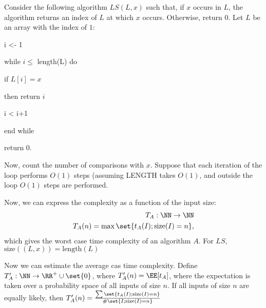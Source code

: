 \documentclass[11pt]{scrartcl}
\begin{document}
\begin{example}

  Consider the following algorithm $LS(L, x)$ such that, if $x$ occurs
  in $L$, the algorithm returns an index of $L$ at which $x$
  occurs. Otherwise, return $0$. Let $L$ be  an array with the index of $1$:

  i <- 1
  
  while $i\leq$ length(L) do

  if $L[i] = x$

  then return $i$

  i < i+1

  end while

  return 0.

  Now, count the number of comparisons with $x$. Suppose that each
  iteration of the loop performs $O(1)$ steps (assuming LENGTH takes
  $O(1)$, and outside the loop $O(1)$ steps are performed.

  Now, we can express the complexity as a function of the input size:
  \begin{align}
    T_A: \NN \to \NN\\
    T_A(n)=\max\set{t_A(I); \text{size}(I) = n},
  \end{align}
  which gives the worst case time complexity of an algorithm $A$. For $LS$, $\text{size}((L, x)) = \text{length}(L)$
\end{example}
\begin{example}
  Now we can estimate the average cas time complexity. Define $T'_A:\NN\to\RR^+\cup\set{0}$, where $T_A'(n) = \EE[t_{A}]$, where the expectation is taken over a probability space of all inputs of size $n$. If all inputs of size $n$ are equally likely,  then $T'_A(n) = \frac{\sum \set{t_A(I); \text{size}(I) =n}}{\#\set{I; \text{size}(I) = n }}$


\end{example}
\end{document}
